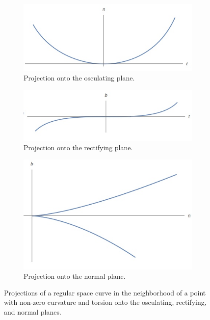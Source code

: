 \documentclass[12pt,letterpaper,reqno]{article}
\numberwithin{equation}{section}
\begin{document}
{\begin{figure}[h]
\centering
\begin{subfigure}{.5\textwidth}
  \centering
  \includegraphics[width=.8\linewidth]{figures_mvc/tn_projection}
  \caption{Projection onto the osculating plane.}
  \label{fig:sub1}
\end{subfigure}%
\begin{subfigure}{.5\textwidth}
  \centering
  \includegraphics[width=.8\linewidth]{figures_mvc/tb_projection}
  \caption{Projection onto the rectifying plane.}
  \label{fig:sub2}
\end{subfigure}
\begin{subfigure}{.5\textwidth}
  \centering
  \includegraphics[width=.8\linewidth]{figures_mvc/bn_projection}
  \caption{Projection onto the normal plane.}
  \label{fig:sub3}
\end{subfigure}
\caption{Projections of a regular space curve in the neighborhood of a point with non-zero curvature and torsion onto the osculating, rectifying, and normal planes.}
\label{fig:test}
\end{figure}

}
\end{document}
